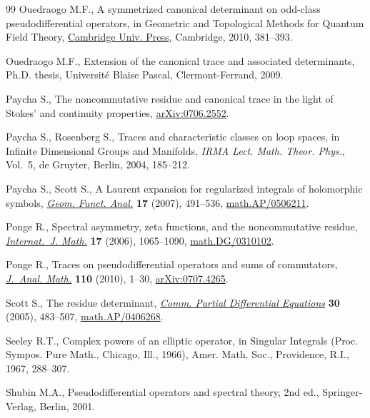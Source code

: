 \documentclass[pdftex]{sigma}
\begin{document}
\begin{thebibliography}{99}
Ouedraogo M.F., A symmetrized canonical determinant on odd-class
  pseudodif\/ferential operators, in Geo\-metric and Topological Methods for
  Quantum Field Theory, \href{http://dx.doi.org/10.1017/CBO9780511712135.012}{Cambridge Univ. Press}, Cambridge, 2010, 381--393.

Ouedraogo M.F., Extension of the canonical trace and associated determinants,
  Ph.D. thesis, Universit\'e Blaise Pascal, Clermont-Ferrand, 2009.


Paycha S., The noncommutative residue and canonical trace in the light of
  {S}tokes' and continuity properties, \href{http://arxiv.org/abs/0706.2552}{arXiv:0706.2552}.

Paycha S., Rosenberg S., Traces and characteristic classes on loop spaces, in
  Inf\/inite Dimensional Groups and Manifolds, \textit{IRMA Lect. Math. Theor.
  Phys.}, Vol.~5, de Gruyter, Berlin, 2004, 185--212.

Paycha S., Scott S., A {L}aurent expansion for regularized integrals of
  holomorphic symbols, \href{http://dx.doi.org/10.1007/s00039-007-0597-8}{\textit{Geom. Funct. Anal.}} \textbf{17} (2007),
  491--536, \href{http://arxiv.org/abs/math.AP/0506211}{math.AP/0506211}.

Ponge R., Spectral asymmetry, zeta functions, and the noncommutative residue,
  \href{http://dx.doi.org/10.1142/S0129167X06003825}{\textit{Internat.~J. Math.}} \textbf{17} (2006), 1065--1090,
  \href{http://arxiv.org/abs/math.DG/0310102}{math.DG/0310102}.

Ponge R., Traces on pseudodif\/ferential operators and sums of commutators,
  \href{http://dx.doi.org/10.1007/s11854-010-0001-8}{\textit{J.~Anal. Math.}} \textbf{110} (2010), 1--30, \href{http://arxiv.org/abs/0707.4265}{arXiv:0707.4265}.

Scott S., The residue determinant, \href{http://dx.doi.org/10.1081/PDE-200050102}{\textit{Comm. Partial Differential
  Equations}} \textbf{30} (2005), 483--507, \href{http://arxiv.org/abs/math.AP/0406268}{math.AP/0406268}.

Seeley R.T., Complex powers of an elliptic operator, in Singular {I}ntegrals
  ({P}roc. {S}ympos. {P}ure {M}ath., {C}hicago, {I}ll., 1966), Amer. Math.
  Soc., Providence, R.I., 1967, 288--307.

Shubin M.A., Pseudodif\/ferential operators and spectral theory, 2nd ed.,
  Springer-Verlag, Berlin, 2001.


\end{thebibliography}
\end{document}
